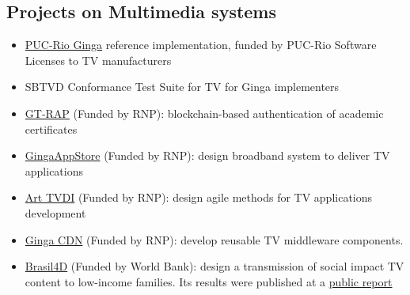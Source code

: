 \documentclass[10pt,a4paper,sans,colorlinks]{moderncv}
\begin{document}
  \subsection{Projects on Multimedia systems}
    \begin{itemize}[mynosep]
      \item \href{https://github.com/TeleMidia/ginga}{PUC-Rio Ginga} reference implementation, funded by PUC-Rio Software Licenses to TV manufacturers
      \item SBTVD Conformance Test Suite for TV for Ginga implementers
      \item \href{http://wrnp.rnp.br/sites/wrnp2017/files/02_wrnp2017_poster_gt-sap_design.pdf}{GT-RAP} (Funded by RNP): blockchain-based authentication of academic certificates
      \item \href{http://www.redetic.rnp.br/ctic/2019/01/29/ginga-appstore/}{GingaAppStore} (Funded by RNP): design broadband system to deliver TV applications
      \item \href{http://www.redetic.rnp.br/ctic/2019/01/29/arttvdi/}{Art TVDI} (Funded by RNP): design agile methods for TV applications development
      \item \href{http://www.redetic.rnp.br/ctic/2019/01/29/gingarap-gingafrevo/}{Ginga CDN} (Funded by RNP): develop reusable TV middleware components.
      \item \href{http://www.ebc.com.br/brasil-4d}{Brasil4D} (Funded by World Bank): design a transmission of social impact TV content to low-income families. Its results were published at a \href{http://documents.worldbank.org/curated/en/232621468230956108/pdf/809560WP0PORTU0Box0379824B00PUBLIC0.pdf}{public report}
    \end{itemize}
\end{document}
